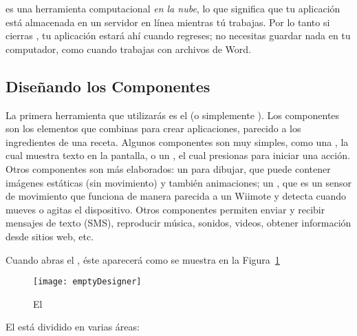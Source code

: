 \AppInventor es una herramienta computacional \emph{en la nube}, lo
que significa que tu aplicación está almacenada en un servidor en
línea mientras tú trabajas. Por lo tanto si cierras \AppInventor, tu
aplicación estará ahí cuando regreses; no necesitas guardar nada en tu
computador, como cuando trabajas con archivos de Word.


\subsection*{Diseñando los Componentes}

La primera herramienta que utilizarás es el \componentDesigner (o
simplemente \designer). Los componentes son los elementos que combinas
para crear aplicaciones, parecido a los ingredientes de una
receta. Algunos componentes son muy simples, como una
, la cual muestra texto en la pantalla, o un
, el cual presionas para iniciar una acción. Otros
componentes son más elaborados: un  para dibujar,
que puede contener imágenes estáticas (sin movimiento) y también
animaciones; un , que es un sensor de
movimiento que funciona de manera parecida a un Wiimote y detecta
cuando mueves o agitas el dispositivo. Otros componentes permiten
enviar y recibir mensajes de texto (SMS), reproducir música, sonidos,
videos, obtener información desde sitios web, etc.

Cuando abras el \designer, éste aparecerá como se muestra en la
Figura~\ref{fig:emptyDesigner}

\begin{figure}[H]
  \centering
  \texttt{[image: emptyDesigner]}
  \caption{El \componentDesigner}
  \label{fig:emptyDesigner}
\end{figure}

El \designer está dividido en varias áreas:

